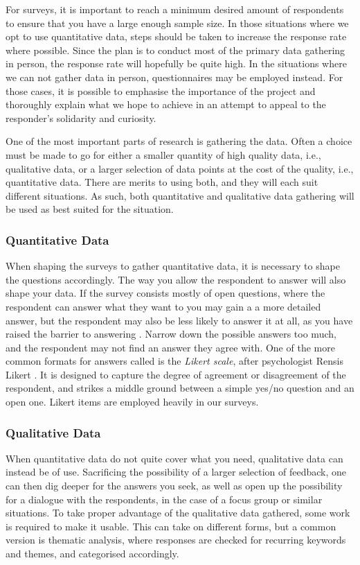 For surveys, it is important to reach a minimum desired amount of respondents to ensure that you have a large enough sample size. In those situations where we opt to use quantitative data, steps should be taken to increase the response rate where possible. Since the plan is to conduct most of the primary data gathering in person, the response rate will hopefully be quite high. In the situations where we can not gather data in person, questionnaires may be employed instead. For those cases, it is possible to emphasise the importance of the project and thoroughly explain what we hope to achieve in an attempt to appeal to the responder's solidarity and curiosity. 

One of the most important parts of research is gathering the data. Often a choice must be made to go for either a smaller quantity of high quality data, i.e., qualitative data, or a larger selection of data points at the cost of the quality, i.e., quantitative data. There are merits to using both, and they will each suit different situations. As such, both quantitative and qualitative data gathering will be used as best suited for the situation.

\subsubsection{Quantitative Data}
When shaping the surveys to gather quantitative data, it is necessary to shape the questions accordingly. The way you allow the respondent to answer will also shape your data. If the survey consists mostly of open questions, where the respondent can answer what they want to you may gain a a more detailed answer, but the respondent may also be less likely to answer it at all, as you have raised the barrier to answering \cite{oates2005researching}. Narrow down the possible answers too much, and the respondent may not find an answer they agree with. One of the more common formats for answers called is the \textit{Likert scale}, after psychologist Rensis Likert \cite{likert1932technique}. It is designed to capture the degree of agreement or disagreement of the respondent, and strikes a middle ground between a simple yes/no question and an open one. Likert items are employed heavily in our surveys.


\subsubsection{Qualitative Data}
When quantitative data do not quite cover what you need, qualitative data can instead be of use. Sacrificing the possibility of a larger selection of feedback, one can then dig deeper for the answers you seek, as well as open up the possibility for a dialogue with the respondents, in the case of a focus group or similar situations. To take proper advantage of the qualitative data gathered, some work is required to make it usable. This can take on different forms, but a common version is thematic analysis, where responses are checked for recurring keywords and themes, and categorised accordingly.

